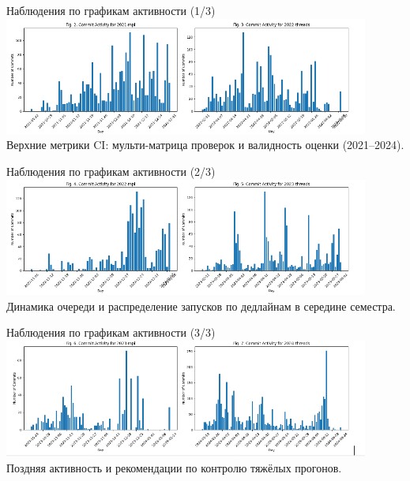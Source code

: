 \documentclass{beamer}
\begin{document}
\begin{frame}{Наблюдения по графикам активности (1/3)}
  \centering
  \includegraphics[width=0.9\textwidth]{10-course-processes/activity-ci-segment-1.png}
  \vspace{0.5em}
  \small Верхние метрики CI: мульти-матрица проверок и валидность оценки (2021--2024).
\end{frame}

\begin{frame}{Наблюдения по графикам активности (2/3)}
  \centering
  \includegraphics[width=0.9\textwidth]{10-course-processes/activity-ci-segment-2.png}
  \vspace{0.5em}
  \small Динамика очереди и распределение запусков по дедлайнам в середине семестра.
\end{frame}

\begin{frame}{Наблюдения по графикам активности (3/3)}
  \centering
  \includegraphics[width=0.9\textwidth]{10-course-processes/activity-ci-segment-3.png}
  \vspace{0.5em}
  \small Поздняя активность и рекомендации по контролю тяжёлых прогонов.
\end{frame}
\end{document}
